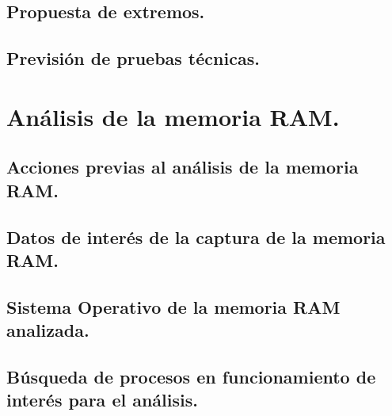 \documentclass[12pt,a4paper]{report}
\begin{document}
\section{Propuesta de extremos.}

\clearpage

\section{Previsión de pruebas técnicas.}

\clearpage

\chapter{Análisis de la memoria RAM.}

\clearpage

\section{Acciones previas al análisis de la memoria RAM.}

\clearpage

\section{Datos de interés de la captura de la memoria RAM.}

\clearpage

\section{Sistema Operativo de la memoria RAM analizada.}

\clearpage

\section{Búsqueda de procesos en funcionamiento de interés para el análisis.}

\clearpage
\end{document}
